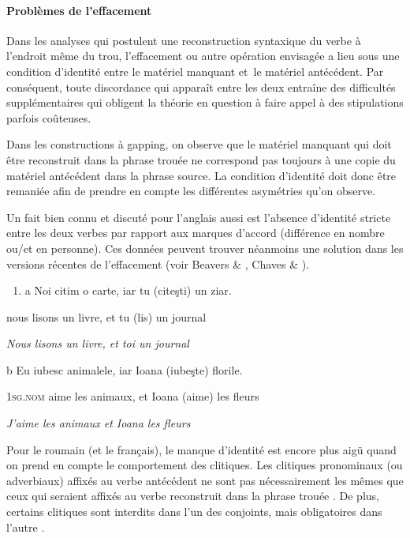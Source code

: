 \paragraph[Problèmes de l'effacement]{Problèmes de l'effacement}
Dans les analyses qui postulent une reconstruction syntaxique du verbe à l'endroit même du trou, l'effacement ou autre opération envisagée a lieu sous une condition d'identité entre le matériel manquant et~le matériel antécédent. Par conséquent, toute discordance qui apparaît entre les deux entraîne des difficultés supplémentaires qui obligent la théorie en question à faire appel à des stipulations parfois coûteuses.

Dans les constructions à gapping, on observe que le matériel manquant qui doit être reconstruit dans la phrase trouée ne correspond pas toujours à une copie du matériel antécédent dans la phrase source. La condition d'identité doit donc être remaniée afin de prendre en compte les différentes asymétries qu'on observe.

Un fait bien connu et discuté pour l'anglais aussi est l'absence d'identité stricte entre les deux verbes par rapport aux marques d'accord (différence en nombre ou/et en personne). Ces données peuvent trouver néanmoins une solution dans les versions récentes de l'effacement (voir Beavers \& \citet{Sag2004}, Chaves \& \citet{Sag2008}). 


\begin{enumerate}
\item a  Noi citim o carte, iar tu (citeşti) un ziar.


\end{enumerate}
    nous lisons un livre, et tu (lis) un journal

{\itshape
Nous lisons un livre, et toi un journal}

  b  Eu iubesc animalele, iar Ioana (iubeşte) florile.

    \textsc{1sg.nom} aime les animaux, et Ioana (aime) les fleurs

{\itshape
J'aime les animaux et Ioana les fleurs}

Pour le roumain (et le français), le manque d'identité est encore plus aigü quand on prend en compte le comportement des clitiques. Les clitiques pronominaux (ou adverbiaux) affixés au verbe antécédent ne sont pas nécessairement les mêmes que ceux qui seraient affixés au verbe reconstruit dans la phrase trouée . De plus, certains clitiques sont interdits dans l'un des conjoints, mais obligatoires dans l'autre . 


